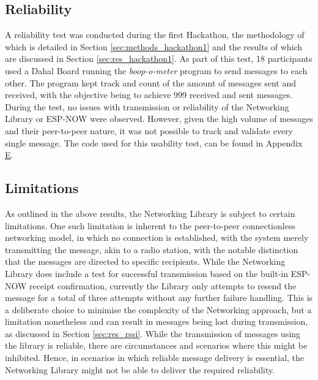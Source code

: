 \subsection{\label{sec:res_reliability}Reliability}
A reliability test was conducted during the first Hackathon, the methodology of which is detailed in Section \ref{sec:methods_hackathon1} and the results of which are discussed in Section \ref{sec:res_hackathon1}. As part of this test, 18 participants used a Dahal Board running the \textit{boop-o-meter} program to send messages to each other. The program kept track and count of the amount of messages sent and received, with the objective being to achieve 999 received and sent messages. During the test, no issues with transmission or reliability of the Networking Library or ESP-NOW were observed. However, given the high volume of messages and their peer-to-peer nature, it was not possible to track and validate every single message. The code used for this usability test, can be found in Appendix \hyperref[chap:apx_e]{E}.

\subsection{\label{sec:res_limitations}Limitations}

As outlined in the above results, the Networking Library is subject to certain limitations. One such limitation is inherent to the peer-to-peer connectionless networking model, in which no connection is established, with the system merely transmitting the message, akin to a radio station, with the notable distinction that the messages are directed to specific recipients. While the Networking Library does include a test for successful transmission based on the built-in ESP-NOW receipt confirmation, currently the Library only attempts to resend the message for a total of three attempts without any further failure handling. This is a deliberate choice to minimise the complexity of the Networking approach, but a limitation nonetheless and can result in messages being lost during transmission, as discussed in Section \ref{sec:res_rssi}. While the transmission of messages using the library is reliable, there are circumstances and scenarios where this might be inhibited. Hence, in scenarios in which reliable message delivery is essential, the Networking Library might not be able to deliver the required reliability. \\

